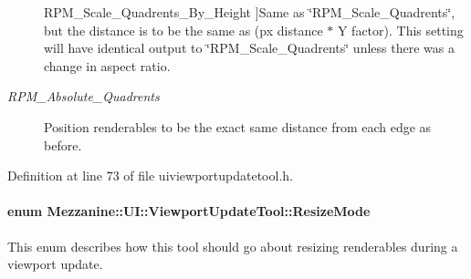 \begin{Desc}
\begin{description}
{{RPM\_\-Scale\_\-Quadrents\_\-By\_\-Height}
\label{classMezzanine_1_1UI_1_1ViewportUpdateTool_ad2de82a6fc57859d914845ce676ff67ea5689ccb5755157c9a3fb8088ba89bbf2}
}]Same as \char`\"{}RPM\_\-Scale\_\-Quadrents\char`\"{}, but the distance is to be the same as (px distance $\ast$ Y factor). This setting will have identical output to \char`\"{}RPM\_\-Scale\_\-Quadrents\char`\"{} unless there was a change in aspect ratio. \item[{\em 
\hypertarget{classMezzanine_1_1UI_1_1ViewportUpdateTool_ad2de82a6fc57859d914845ce676ff67eaad6d1e0cde23b744226a1ae7548eedee}{
RPM\_\-Absolute\_\-Quadrents}
\label{classMezzanine_1_1UI_1_1ViewportUpdateTool_ad2de82a6fc57859d914845ce676ff67eaad6d1e0cde23b744226a1ae7548eedee}
}]Position renderables to be the exact same distance from each edge as before. \end{description}
\end{Desc}



Definition at line 73 of file uiviewportupdatetool.h.

\hypertarget{classMezzanine_1_1UI_1_1ViewportUpdateTool_a89afdf79f52d5bf18bdffd323911a549}{
\paragraph[{ResizeMode}]{\setlength{\rightskip}{0pt plus 5cm}enum {\bf Mezzanine::UI::ViewportUpdateTool::ResizeMode}}\hfill}
\label{classMezzanine_1_1UI_1_1ViewportUpdateTool_a89afdf79f52d5bf18bdffd323911a549}


This enum describes how this tool should go about resizing renderables during a viewport update. 

